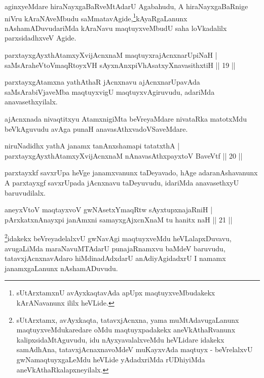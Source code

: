 \begin{artha}
aginxyeMdare hiraNayxgaBaRveMtAdarU Agabahudu, A hiraNayxgaBaRnige niVru kAraNAveMbudu 
saMmatavAgide,\footnote{sUtArxtamxnU avAyxkaqtavAda apUpx maqtuyxveMbudakekx kArANavanunx  
ililx heVLide.}kAyaRgaLanunx nAshamADuvudariMda kAraNavu maqtuyxveMbudU saha loVkadalilx parxsidadhxveV Agide.
\end{artha}


\begin{shl}
parxtayxgAyxthAtamxyXvijAcnxnaM maqtuyxrajAcnxnarUpiNaH |\\
saMsAraheVtoVmaqRtoyxVH sAyxnAnxpiVhAsatxyXnavasithxtiH \hfill || 19 ||
\end{shl}

\begin{artha}
parxtayxgAtamxna yathAthaR jAcnxnavu ajAcnxnarUpavAda saMsArabiVjaveMba maqtuyxvigU maqtuyxvAgiruvudu, adariMda anavasethxyilalx.
\end{artha}

\begin{artha}
ajAcnxnada nivaqtitxyu AtamxnigiMta beVreyaMdare nivataRka matotxMdu beVkAguvudu avAga 
punaH anavasAthxvadoVSaveMdare.
\end{artha}


\begin{shl}
niruNadidhx yathA janamx tanAnxshamapi tatatxthA |\\
parxtayxgAyxthAtamxyXvijAcnxnaM nAnavasAthx\s payxtoV BaveVtf \hfill || 20 ||
\end{shl}

\begin{artha}
parxtayxkf savxrUpa heVge janamxvanunx taDeyavado, hAge adaranAshavanunx A parxtayxgf 
savxrUpada jAcnxnavu taDeyuvudu, idariMda anavasethxyU baruvudilalx.
\end{artha}

\begin{shl}
aneyxV\s toV maqtayxvoV gwNAsetxYmaqRtw sAyxtupxnajaRniH |\\
pArxkatxnAnayxpi janAmxni samayxgAjxcnXnaM tu hanitx naH \hfill || 21 ||
\end{shl}

\begin{artha}
\footnote{sUtArxtamx, avAyxkaqta, tatavxjAcnxna, yama muMtAdavugaLanunx 
maqtuyxveMdukaredare oMdu maqtuyxpadakekx aneVkAthaRvanunx kalipxsidaMtAguvudu, idu 
nAyxyavalalxveMdu heVLidare idakekx samAdhAna, tatavxjAcnaxnavoMdeV muKayxvAda maqtuyx -   
beVrelalxvU gwNamaqtuyxgaLeMdu heVLide yAdadxriMda rUDhiyiMda 
aneVkAthaRkalapxneyilalx.}idakekx beVreyadelalxvU gwNavAgi maqtuyxveMdu heVLalapxDuvavu, avugaLiMda maraNavuMTAdarU 
punajaRnamxvu baMdeV baruvudu, tatavxjAcnxnavAdaro hiMdinadAdxdarU anAdiyAgidadxrU I namamx 
janamxgaLanunx nAshamADuvudu.
\end{artha}


